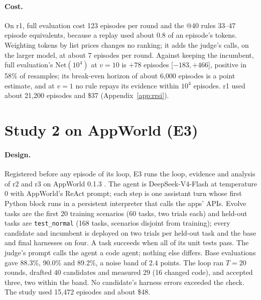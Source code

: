 \documentclass[11pt]{article}
\begin{document}
\paragraph{Cost.} On r1, full evaluation cost 123 episodes per round and the @40 rules 33--47 episode equivalents, because a replay used about 0.8 of an episode's tokens. Weighting tokens by list prices changes no ranking; it adds the judge's calls, on the larger model, at about 7 episodes per round. Against keeping the incumbent, full evaluation's $\mathrm{Net}(10^4)$ at $v=10$ is $+78$ episodes [$-183,+466$], positive in 58\% of resamples; its break-even horizon of about 6{,}000 episodes is a point estimate, and at $v=1$ no rule repays its evidence within $10^4$ episodes. r1 used about 21{,}200 episodes and \$37 (Appendix~\ref{app:rrsi}).

\section{Study 2 on AppWorld (E3)}
\label{app:e3}

\paragraph{Design.} Registered before any episode of its loop, E3 runs the loop, evidence and analysis of r2 and r3 on AppWorld 0.1.3 \citep{trivedi2024appworld}. The agent is DeepSeek-V4-Flash at temperature 0 with AppWorld's ReAct prompt; each step is one assistant turn whose first Python block runs in a persistent interpreter that calls the apps' APIs. Evolve tasks are the first 20 training scenarios (60 tasks, two trials each) and held-out tasks are \texttt{test\_normal} (168 tasks, scenarios disjoint from training); every candidate and incumbent is deployed on two trials per held-out task and the base and final harnesses on four. A task succeeds when all of its unit tests pass. The judge's prompt calls the agent a code agent; nothing else differs. Base evaluations gave 88.3\%, 90.0\% and 89.2\%, a noise band of 2.4 points. The loop ran $T=20$ rounds, drafted 40 candidates and measured 29 (16 changed code), and accepted three, two within the band. No candidate's harness errors exceeded the check. The study used 15{,}472 episodes and about \$48.

\begin{table}[t]
\centering
\small
\setlength{\tabcolsep}{2pt}
\caption{E3 (AppWorld, 20 rounds): decision value $D$ under the common error check in points per round, episodes per round, and the registered non-inferiority contrasts with full evaluation (margin 0.75, one-sided $p$, Holm within each family), with 90\% intervals from the block bootstrap.}
\label{tab:e3}
\end{table}
\end{document}
